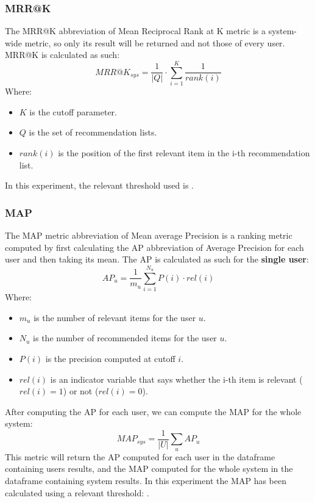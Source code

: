 \subsubsection{MRR@K}\label{subsubsec:mrr-k}
The MRR@K abbreviation of Mean Reciprocal Rank at K metric is a system-wide metric, so only its result will be returned
and not those of every user.
MRR@K is calculated as such:
\hfill\break
\hfill\break
    \[
        MRR@K_{sys} = \frac{1}{|Q|}\cdot\sum_{i=1}^{K}\frac{1}{rank(i)}
    \]
\hfill\break
\hfill\break
    Where:
\begin{itemize}
    \item $K$ is the cutoff parameter.
    \item $Q$ is the set of recommendation lists.
    \item $rank(i)$ is the position of the first relevant item in the i-th recommendation list.
\end{itemize}
\hfill\break
\hfill\break
In this experiment, the relevant threshold used is
.
\hfill\break
\hfill\break

\subsubsection{MAP}\label{subsubsec:map}
The MAP metric abbreviation of Mean average Precision is a ranking metric computed by first calculating the AP
abbreviation of Average Precision for each user and then taking its mean.
The AP is calculated as such for the \textbf{single user}:
\hfill\break
\hfill\break
    \[
        AP_u = \frac{1}{m_u}\sum_{i=1}^{N_u}P(i)\cdot rel(i)
    \]
\hfill\break
\hfill\break
    Where:
\begin{itemize}
    \item $m_u$ is the number of relevant items for the user $u$.
    \item $N_u$ is the number of recommended items for the user $u$.
    \item $P(i)$ is the precision computed at cutoff $i$.
    \item $rel(i)$ is an indicator variable that says whether the i-th item is relevant ($rel(i)=1$) or not ($rel(i)=0$).
\end{itemize}
\hfill\break
\hfill\break
After computing the AP for each user, we can compute the MAP for the whole system:
\hfill\break
\hfill\break
    \[
        MAP_{sys} = \frac{1}{|U|}\sum_{u}AP_u
    \]
\hfill\break
\hfill\break
This metric will return the AP computed for each user in the dataframe containing users results, and the MAP
computed for the whole system in the dataframe containing system results.
In this experiment the MAP has been calculated using a relevant threshold:
.
\hfill\break
\hfill\break

